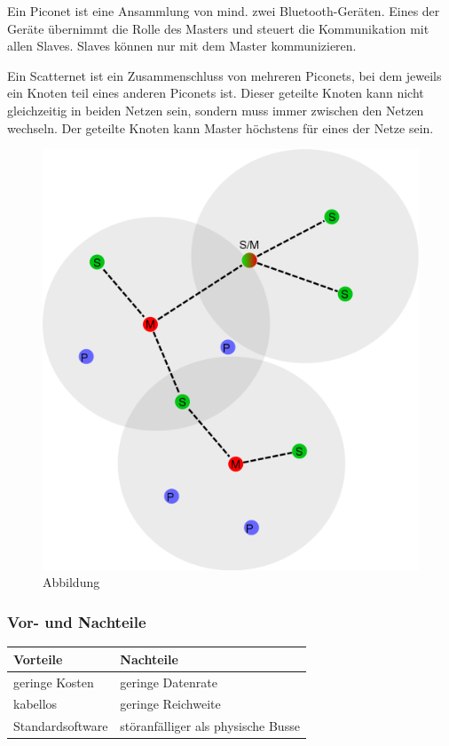 Ein Piconet ist eine Ansammlung von mind. zwei Bluetooth-Geräten. Eines der Geräte übernimmt die Rolle des Masters und steuert die Kommunikation mit allen Slaves. Slaves können nur mit dem Master kommunizieren.

Ein Scatternet ist ein Zusammenschluss von mehreren Piconets, bei dem jeweils ein Knoten teil eines anderen Piconets ist. Dieser geteilte Knoten kann nicht gleichzeitig in beiden Netzen sein, sondern muss immer zwischen den Netzen wechseln. Der geteilte Knoten kann Master höchstens für eines der Netze sein.

\begin{figure}[h!]
	\includegraphics[width=0.7\linewidth]{pico_scatternet.png}
	\caption{Abbildung  \cite{.MH_Scatter}}
\end{figure}

\subsubsection{Vor- und Nachteile}
\begin{tabular}{l|l}
	\textbf{Vorteile} & \textbf{Nachteile}\\
	\hline geringe Kosten & geringe Datenrate\\
	\hline kabellos & geringe Reichweite\\
	\hline Standardsoftware & störanfälliger als physische Busse\\
\end{tabular}